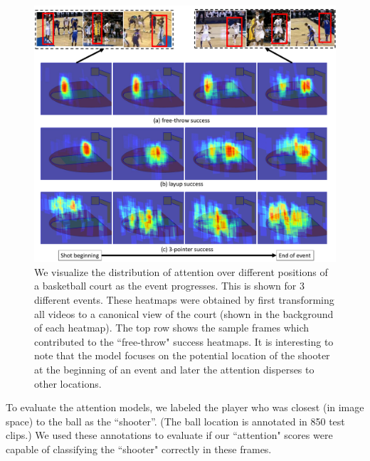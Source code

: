 \begin{figure}[t!]
\begin{center}
  \vspace{-4mm}
  \includegraphics[width=0.9\linewidth]{images/heatmap_figure_v2_cropped.pdf}
\end{center}
  \vspace{-4mm}
   \caption{We visualize the distribution of attention over different positions of
   a basketball court as the event progresses. This is shown for 3 different events.
   These heatmaps were obtained by first transforming all videos
 to a canonical view of the court (shown in the background of each heatmap). The top row shows
 the sample frames which contributed to the ``free-throw" success heatmaps. It is interesting
 to note that the model focuses on the potential location of the shooter at the beginning of an
 event and later the attention disperses to other locations.}
  \vspace{-4mm}
\label{fig:att_heatmap}
\end{figure}

To evaluate the attention models, we  labeled the player who was
closest (in image space) to the ball as the ``shooter''.
(The ball location is annotated in 850 test clips.)
We used these annotations to evaluate if our ``attention" scores
were capable of classifying the ``shooter" correctly in these frames.

